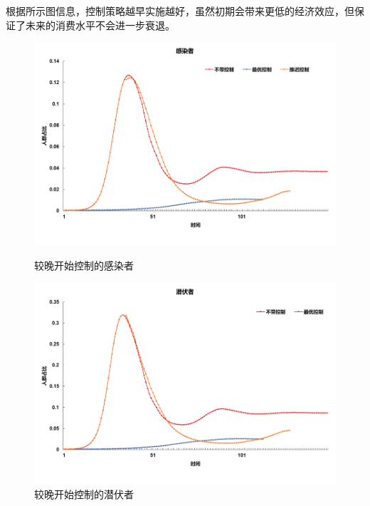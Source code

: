 根据所示图信息，控制策略越早实施越好，虽然初期会带来更低的经济效应，但保证了未来的消费水平不会进一步衰退。
\begin{figure}[htbp]
	\centering
	\begin{minipage}{0.49\linewidth}
		\centering
		\includegraphics[width=0.9\linewidth]{fig/image036.png}
		\caption{较晚开始控制的感染者}
		\label{fig:ima17}%
	\end{minipage}
	\begin{minipage}{0.49\linewidth}
		\centering
		\includegraphics[width=0.9\linewidth]{fig/image040.png}
		\caption{较晚开始控制的潜伏者}
		\label{fig:ima18}%
	\end{minipage}
	

\end{figure}
